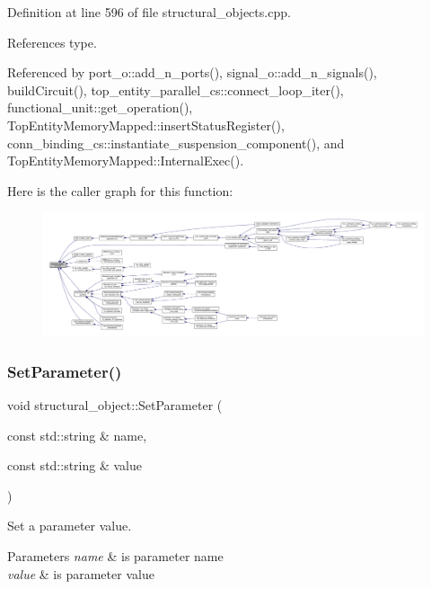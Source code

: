 Definition at line 596 of file structural\+\_\+objects.\+cpp.



References type.



Referenced by port\+\_\+o\+::add\+\_\+n\+\_\+ports(), signal\+\_\+o\+::add\+\_\+n\+\_\+signals(), build\+Circuit(), top\+\_\+entity\+\_\+parallel\+\_\+cs\+::connect\+\_\+loop\+\_\+iter(), functional\+\_\+unit\+::get\+\_\+operation(), Top\+Entity\+Memory\+Mapped\+::insert\+Status\+Register(), conn\+\_\+binding\+\_\+cs\+::instantiate\+\_\+suspension\+\_\+component(), and Top\+Entity\+Memory\+Mapped\+::\+Internal\+Exec().

Here is the caller graph for this function\+:
\nopagebreak
\begin{figure}[H]
\begin{center}
\leavevmode
\includegraphics[width=350pt]{d8/da3/classstructural__object_a2fb4f8c4b7f0095f12ce03062f851df3_icgraph}
\end{center}
\end{figure}
\mbox{\label{classstructural__object_a169dc4335ea6a4d40283315b8c30a3a9}} 
\subsubsection{\texorpdfstring{Set\+Parameter()}{SetParameter()}}
{\footnotesize\ttfamily void structural\+\_\+object\+::\+Set\+Parameter (\begin{DoxyParamCaption}\item[{const std\+::string \&}]{name,  }\item[{const std\+::string \&}]{value }\end{DoxyParamCaption})}



Set a parameter value. 


\begin{DoxyParams}{Parameters}
{\em name} & is parameter name \\
\hline
{\em value} & is parameter value \\
\hline
\end{DoxyParams}


